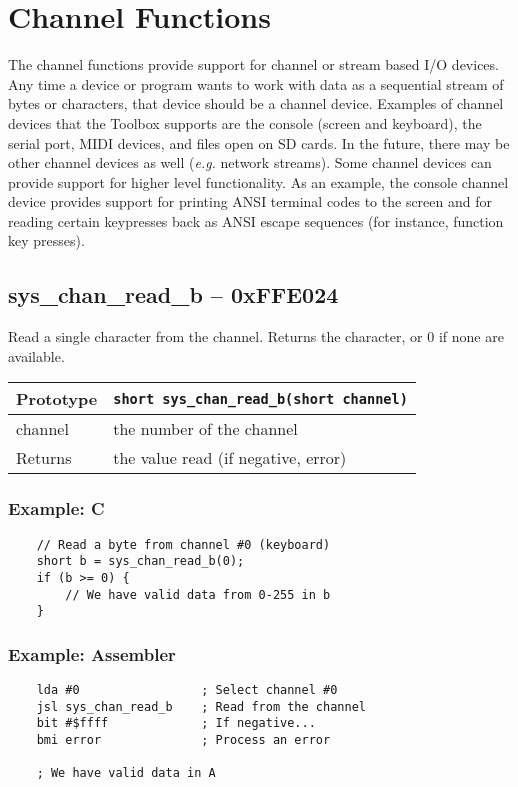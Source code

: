\section{Channel Functions}
The channel functions provide support for channel or stream based I/O devices.
Any time a device or program wants to work with data as a sequential stream of bytes or characters,
that device should be a channel device.
Examples of channel devices that the Toolbox supports are the console (screen and keyboard), the serial port,
MIDI devices, and files open on SD cards.
In the future, there may be other channel devices as well ({\it e.g.} network streams).
Some channel devices can provide support for higher level functionality.
As an example, the console channel device provides support for printing ANSI terminal codes to the screen
and for reading certain keypresses back as ANSI escape sequences (for instance, function key presses).

\subsection*{sys\_chan\_read\_b -- 0xFFE024}
Read a single character from the channel. Returns the character, or 0 if none are available.

\bigskip

\begin{tabular}{|l||l|} \hline
Prototype & \lstinline!short sys_chan_read_b(short channel)! \\ \hline
channel & the number of the channel \\ \hline
Returns & the value read (if negative, error) \\ \hline
\end{tabular}

\subsubsection*{Example: C}
\begin{lstlisting}
    // Read a byte from channel #0 (keyboard)
    short b = sys_chan_read_b(0);
    if (b >= 0) {
        // We have valid data from 0-255 in b
    }
\end{lstlisting}

\subsubsection*{Example: Assembler}
\begin{verbatim}
    lda #0                 ; Select channel #0
    jsl sys_chan_read_b    ; Read from the channel
    bit #$ffff             ; If negative...
    bmi error              ; Process an error

    ; We have valid data in A
\end{verbatim}

